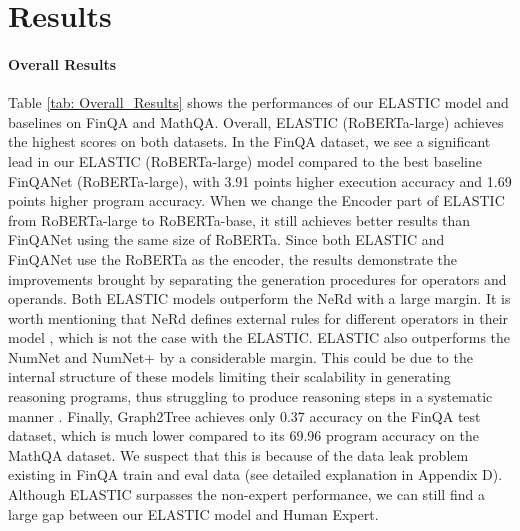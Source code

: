 \documentclass{article}
\begin{document}
\section{Results}

\paragraph{Overall Results}
Table \ref{tab: Overall_Results} shows the performances of our ELASTIC model and baselines on FinQA and MathQA. Overall, ELASTIC (RoBERTa-large) achieves the highest scores on both datasets. In the FinQA dataset, we see a significant lead in our ELASTIC (RoBERTa-large) model compared to the best baseline FinQANet (RoBERTa-large), with 3.91 points higher execution accuracy and 1.69 points higher program accuracy. When we change the Encoder part of ELASTIC from RoBERTa-large to RoBERTa-base, it still achieves better results than FinQANet using the same size of RoBERTa. Since both ELASTIC and FinQANet use the RoBERTa as the encoder, the results demonstrate the improvements brought by separating the generation procedures for operators and operands. Both ELASTIC models outperform the NeRd with a large margin. It is worth mentioning that NeRd defines external rules for different operators in their model \cite{NeRd}, which is not the case with the ELASTIC. 
ELASTIC also outperforms the NumNet and NumNet+ by a considerable margin. This could be due to the internal structure of these models limiting their scalability in generating reasoning programs, thus struggling to produce reasoning steps in a systematic manner \cite{ref_25}.
Finally, Graph2Tree achieves only 0.37 accuracy on the FinQA test dataset, which is much lower compared to its 69.96 program accuracy on the MathQA dataset. We suspect that this is because of the data leak problem existing in FinQA train and eval data (see detailed explanation in Appendix D). Although ELASTIC surpasses the non-expert performance, we can still find a large gap between our ELASTIC model and Human Expert.
\end{document}
